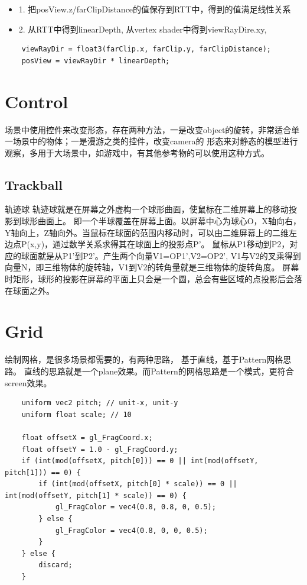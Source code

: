 \begin{itemize}
    \item {1. 把posView.z/farClipDistance的值保存到RTT中，得到的值满足线性关系}
    \item {2. 从RTT中得到linearDepth, 从vertex shader中得到viewRayDire.xy, }
\end{itemize}

\begin{lstlisting}
    viewRayDir = float3(farClip.x, farClip.y, farClipDistance);
    posView = viewRayDir * linearDepth;
\end{lstlisting}

\section{Control}

场景中使用控件来改变形态，存在两种方法，一是改变object的旋转，非常适合单一场景中的物体；一是漫游之类的控件，改变camera的
形态来对静态的模型进行观察，多用于大场景中，如游戏中，有其他参考物的可以使用这种方式。

\subsection{Trackball}
轨迹球\cite{Trackball}
轨迹球就是在屏幕之外虚构一个球形曲面，使鼠标在二维屏幕上的移动投影到球形曲面上。
即一个半球覆盖在屏幕上面。以屏幕中心为球心O，X轴向右，Y轴向上，Z轴向外。当鼠标在球面的范围内移动时，可以由二维屏幕上的二维左边点P(x,y)，通过数学关系求得其在球面上的投影点P'。
鼠标从P1移动到P2，对应的球面就是从P1'到P2'。产生两个向量V1=OP1',V2=OP2',  
V1与V2的叉乘得到向量N，即三维物体的旋转轴，V1到V2的转角量就是三维物体的旋转角度。
屏幕时矩形，球形的投影在屏幕的平面上只会是一个圆，总会有些区域的点投影后会落在球面之外。


\section{Grid}
绘制网格，是很多场景都需要的，有两种思路， 基于直线，基于Pattern网格思路。
直线的思路就是一个plane效果。而Pattern的网格思路是一个模式，更符合screen效果。
\begin{lstlisting}
    uniform vec2 pitch; // unit-x, unit-y
    uniform float scale; // 10

    float offsetX = gl_FragCoord.x;
    float offsetY = 1.0 - gl_FragCoord.y;
    if (int(mod(offsetX, pitch[0])) == 0 || int(mod(offsetY, pitch[1])) == 0) {
        if (int(mod(offsetX, pitch[0] * scale)) == 0 || int(mod(offsetY, pitch[1] * scale)) == 0) {
            gl_FragColor = vec4(0.8, 0.8, 0, 0.5);
        } else {
            gl_FragColor = vec4(0.8, 0, 0, 0.5);
        }
    } else {
        discard;
    }
\end{lstlisting}

